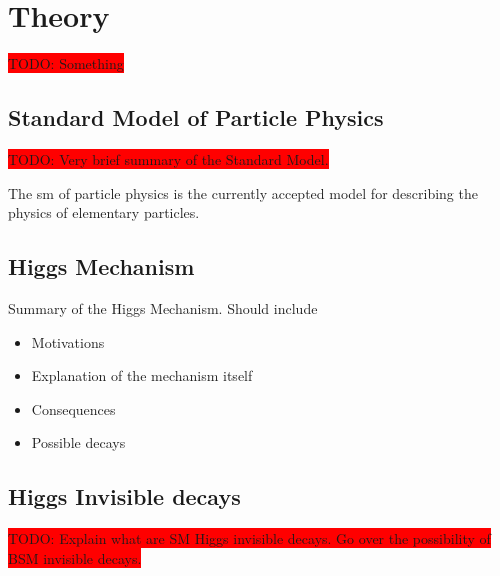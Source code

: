 \chapter{Theory}

\colorbox{red}{TODO: Something}

\section{Standard Model of Particle Physics}

\colorbox{red}{TODO: Very brief summary of the Standard Model.}

The \gls{sm} of particle physics is the currently accepted model for describing the physics of elementary particles.

\section{Higgs Mechanism}

Summary of the Higgs Mechanism. Should include
\begin{itemize}
 \item Motivations 
 \item Explanation of the mechanism itself
 \item Consequences 
 \item Possible decays
\end{itemize}

\section{Higgs Invisible decays}

\colorbox{red}{TODO: Explain what are SM Higgs invisible decays. Go over the possibility of BSM invisible decays.}
